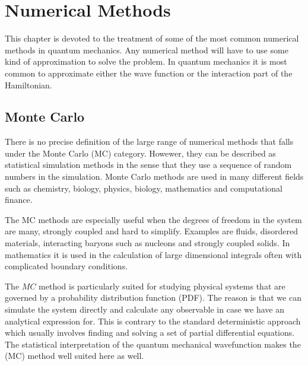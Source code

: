 \chapter{Numerical Methods}
This chapter is devoted to the treatment of some of the most common numerical methods in quantum mechanics. Any numerical method will have to use some kind of approximation to solve the problem. In quantum mechanics it is most common to approximate either the wave function or the interaction part of the Hamiltonian. 

\section{Monte Carlo}
There is no precise definition of the large range of numerical methods that falls under the Monte Carlo (MC) category. Howewer, they can be described as  statistical simulation methods in the sense that they use a sequence of random numbers in the simulation. Monte Carlo methods are used in many different fields such as chemistry, biology, physics, biology, mathematics and computational finance. 
\newline

The MC methods are especially useful when the degrees of freedom in the system are many, strongly coupled and hard to simplify. Examples are fluids, disordered materials, interacting baryons such as nucleons and strongly coupled solids. In mathematics it is used in the calculation of large dimensional integrals often with complicated boundary conditions.   

The $MC$ method is particularly suited for studying physical systems that are governed by a probability distribution function (PDF). The reason is that we can simulate the system directly and calculate any observable in case we have an analytical expression for. This is contrary to the standard deterministic approach which usually involves finding and solving a set of partial differential equations. The statistical interpretation of the quantum mechanical wavefunction makes the (MC) method well suited here as well.  

